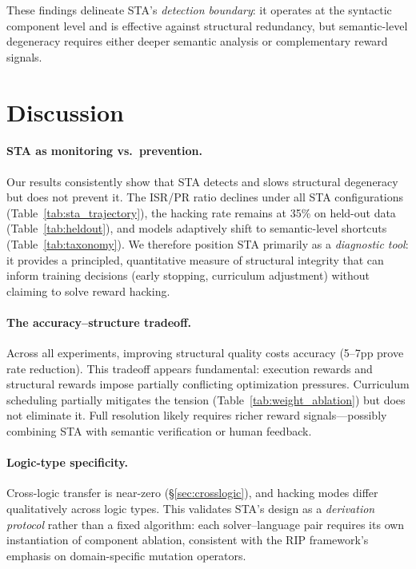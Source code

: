 \documentclass[11pt,a4paper]{article}
\begin{document}
These findings delineate STA's \emph{detection boundary}: it operates at the syntactic component level and is effective against structural redundancy, but semantic-level degeneracy requires either deeper semantic analysis or complementary reward signals.

\section{Discussion}

\paragraph{STA as monitoring vs.\ prevention.}
Our results consistently show that STA detects and slows structural degeneracy but does not prevent it.
The ISR/PR ratio declines under all STA configurations (Table~\ref{tab:sta_trajectory}), the hacking rate remains at 35\% on held-out data (Table~\ref{tab:heldout}), and models adaptively shift to semantic-level shortcuts (Table~\ref{tab:taxonomy}).
We therefore position STA primarily as a \emph{diagnostic tool}: it provides a principled, quantitative measure of structural integrity that can inform training decisions (early stopping, curriculum adjustment) without claiming to solve reward hacking.

\paragraph{The accuracy--structure tradeoff.}
Across all experiments, improving structural quality costs accuracy (5--7pp prove rate reduction).
This tradeoff appears fundamental: execution rewards and structural rewards impose partially conflicting optimization pressures.
Curriculum scheduling partially mitigates the tension (Table~\ref{tab:weight_ablation}) but does not eliminate it.
Full resolution likely requires richer reward signals---possibly combining STA with semantic verification or human feedback.

\paragraph{Logic-type specificity.}
Cross-logic transfer is near-zero (\S\ref{sec:crosslogic}), and hacking modes differ qualitatively across logic types.
This validates STA's design as a \emph{derivation protocol} rather than a fixed algorithm: each solver--language pair requires its own instantiation of component ablation, consistent with the RIP framework's emphasis on domain-specific mutation operators.
\end{document}
